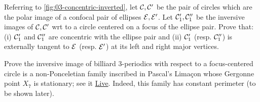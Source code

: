 \begin{exercise}
Referring to \cref{fig:03-concentric-inverted}, let $\mathcal{C},\mathcal{C}'$ be the pair of circles which are the polar image of a confocal pair of ellipses $\mathcal{E},\mathcal{E}'$. Let $\mathcal{C}_1', \mathcal{C}_1''$ be the inversive images of $\mathcal{C},\mathcal{C}'$ wrt to a circle centered on a focus of the ellipse pair. Prove that: (i) $\mathcal{C}_1'$ and $\mathcal{C}_1''$ are concentric with the ellipse pair and (ii) $\mathcal{C}_1'$ (resp. $\mathcal{C}_1''$) is externally tangent to $\mathcal{E}$ (resp. $\mathcal{E}'$) at its left and right major vertices.
\end{exercise}


\begin{exercise}
Prove the inversive image of billiard 3-periodics with respect to a focus-centered circle is a non-Ponceletian family inscribed in Pascal's Limaçon whose Gergonne point $X_7$ is stationary; see it \href{https://bit.ly/3edwKD7}{Live}. Indeed, this family has constant perimeter (to be shown later).
\end{exercise}
